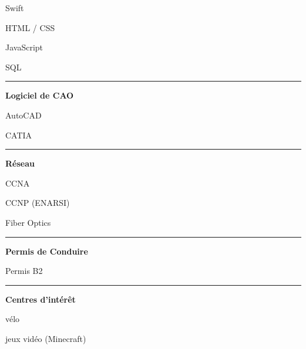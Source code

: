 \documentclass[a4paper]{letter}
\newcommand{\divider}{\rule{\linewidth}{0.9pt}}
\begin{document}
\begin{minipage}[t]{0.40\textwidth}
\faCircleNotch \quad Swift

\faCircleNotch \quad HTML / CSS

\faCircleNotch \quad JavaScript

\faCircleNotch \quad SQL

\divider


{\large \textbf{Logiciel de CAO}}

\faCircleNotch \quad AutoCAD

\faCircleNotch \quad CATIA

\divider



{\large \textbf{Réseau}}

\faNetworkWired \quad CCNA

\faNetworkWired \quad CCNP (ENARSI)

\faNetworkWired \quad Fiber Optics

\divider

{\large \textbf{Permis de Conduire}}

\faCar \quad Permis B2

\divider

{\large \textbf{Centres d'intérêt}}

\faBicycle \quad vélo

\faGamepad \quad jeux vidéo (Minecraft)


\end{minipage}
\hfill
\end{document}
